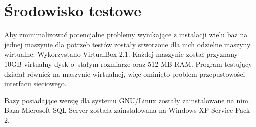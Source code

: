 



\section{Środowisko testowe}

Aby zminimalizować potencjalne problemy wynikające z instalacji wielu baz na 
jednej maszynie dla potrzeb testów zostały stworzone dla nich odzielne maszyny wirtualne. 
Wykorzystano VirtualBox 2.1. Każdej maszynie został przyznany 10GB virtualny dysk 
o~stałym rozmiarze oraz 512 MB RAM. Program testujący działał również na maszynie wirtualnej, 
więc ominięto problem przepustowości interfacu sieciowego. 

Bazy posiadające wersję dla systemu GNU/Linux zostały zainstalowane na nim. 
Baza Microsoft SQL Server została zainstalowana na Windows XP Service Pack 2.
